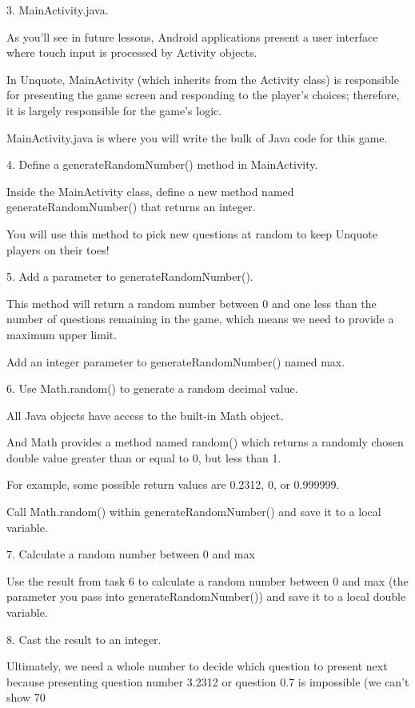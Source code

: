     3.
    MainActivity.java.

    As you’ll see in future lessons, Android applications present a user interface where touch input is processed by Activity objects.

    In Unquote, MainActivity (which inherits from the Activity class) is responsible for presenting the game screen and responding to the player’s choices; therefore, it is largely responsible for the game’s logic.

    MainActivity.java is where you will write the bulk of Java code for this game.

    4.
    Define a generateRandomNumber() method in MainActivity.

    Inside the MainActivity class, define a new method named generateRandomNumber() that returns an integer.

    You will use this method to pick new questions at random to keep Unquote players on their toes!

    5.
    Add a parameter to generateRandomNumber().

    This method will return a random number between 0 and one less than the number of questions remaining in the game, which means we need to provide a maximum upper limit.

    Add an integer parameter to generateRandomNumber() named max.

    6.
    Use Math.random() to generate a random decimal value.

    All Java objects have access to the built-in Math object.

    And Math provides a method named random() which returns a randomly chosen double value greater than or equal to 0, but less than 1.

    For example, some possible return values are 0.2312, 0, or 0.999999.

    Call Math.random() within generateRandomNumber() and save it to a local variable.

    7.
    Calculate a random number between 0 and max

    Use the result from task 6 to calculate a random number between 0 and max (the parameter you pass into generateRandomNumber()) and save it to a local double variable.

    8.
    Cast the result to an integer.

    Ultimately, we need a whole number to decide which question to present next because presenting question number 3.2312 or question 0.7 is impossible (we can’t show 70%

